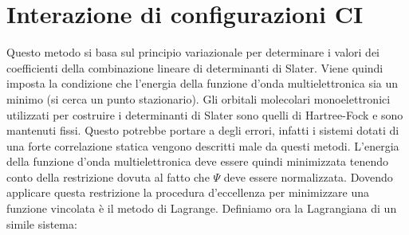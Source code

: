 \documentclass[oneside]{amsbook}
\numberwithin{section}{chapter}
\numberwithin{equation}{section}
\numberwithin{figure}{section}
\begin{document}
\section{Interazione di configurazioni CI}
Questo metodo si basa sul principio variazionale per determinare i valori dei coefficienti della combinazione lineare di determinanti di Slater. Viene quindi imposta la condizione che l'energia della funzione d'onda multielettronica sia un minimo (si cerca un punto stazionario).
Gli orbitali molecolari monoelettronici utilizzati per costruire i determinanti di Slater sono quelli di Hartree-Fock e sono mantenuti fissi. Questo potrebbe portare a degli errori, infatti i sistemi dotati di una forte correlazione statica vengono descritti male da questi metodi. 
L'energia della funzione d'onda multielettronica deve essere quindi minimizzata tenendo conto della restrizione dovuta al fatto che $\Psi$ deve essere normalizzata.
Dovendo applicare questa restrizione la procedura d'eccellenza per minimizzare una funzione vincolata è il metodo di Lagrange. Definiamo ora la Lagrangiana di un simile sistema:
\end{document}

